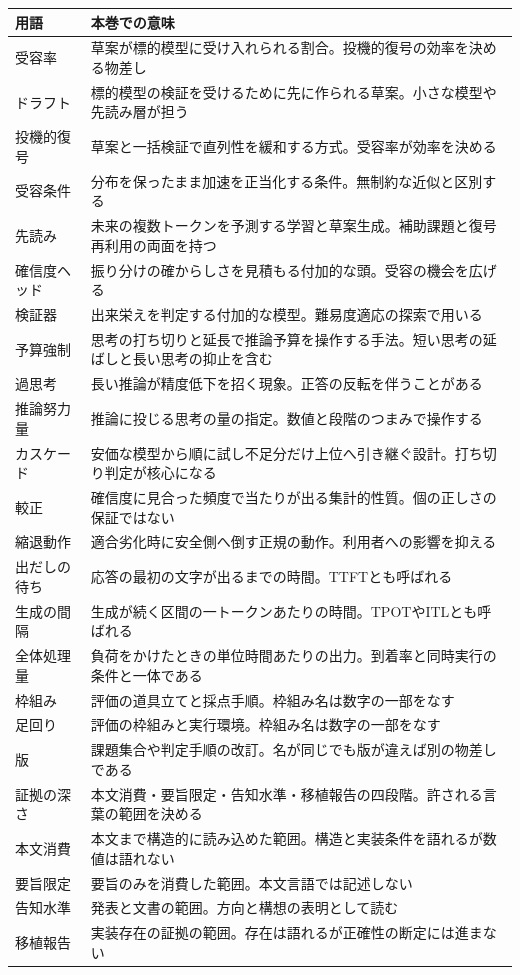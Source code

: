 \documentclass[lualatex,a4paper,10pt]{jlreq}
\begin{document}
\begin{tabular}{@{}p{}p{}@{}}
\toprule
用語 & 本巻での意味 \\
\midrule
受容率 & 草案が標的模型に受け入れられる割合。投機的復号の効率を決める物差し \\
ドラフト & 標的模型の検証を受けるために先に作られる草案。小さな模型や先読み層が担う \\
投機的復号 & 草案と一括検証で直列性を緩和する方式。受容率が効率を決める \\
受容条件 & 分布を保ったまま加速を正当化する条件。無制約な近似と区別する \\
先読み & 未来の複数トークンを予測する学習と草案生成。補助課題と復号再利用の両面を持つ \\
確信度ヘッド & 振り分けの確からしさを見積もる付加的な頭。受容の機会を広げる \\
検証器 & 出来栄えを判定する付加的な模型。難易度適応の探索で用いる \\
予算強制 & 思考の打ち切りと延長で推論予算を操作する手法。短い思考の延ばしと長い思考の抑止を含む \\
過思考 & 長い推論が精度低下を招く現象。正答の反転を伴うことがある \\
推論努力量 & 推論に投じる思考の量の指定。数値と段階のつまみで操作する \\
カスケード & 安価な模型から順に試し不足分だけ上位へ引き継ぐ設計。打ち切り判定が核心になる \\
較正 & 確信度に見合った頻度で当たりが出る集計的性質。個の正しさの保証ではない \\
縮退動作 & 適合劣化時に安全側へ倒す正規の動作。利用者への影響を抑える \\
出だしの待ち & 応答の最初の文字が出るまでの時間。TTFTとも呼ばれる \\
生成の間隔 & 生成が続く区間の一トークンあたりの時間。TPOTやITLとも呼ばれる \\
全体処理量 & 負荷をかけたときの単位時間あたりの出力。到着率と同時実行の条件と一体である \\
枠組み & 評価の道具立てと採点手順。枠組み名は数字の一部をなす \\
足回り & 評価の枠組みと実行環境。枠組み名は数字の一部をなす \\
版 & 課題集合や判定手順の改訂。名が同じでも版が違えば別の物差しである \\
証拠の深さ & 本文消費・要旨限定・告知水準・移植報告の四段階。許される言葉の範囲を決める \\
本文消費 & 本文まで構造的に読み込めた範囲。構造と実装条件を語れるが数値は語れない \\
要旨限定 & 要旨のみを消費した範囲。本文言語では記述しない \\
告知水準 & 発表と文書の範囲。方向と構想の表明として読む \\
移植報告 & 実装存在の証拠の範囲。存在は語れるが正確性の断定には進まない \\
\bottomrule
\end{tabular}
\normalsize

\clearpage
\onecolumn
\printbibliography[title={References}]
\end{document}

